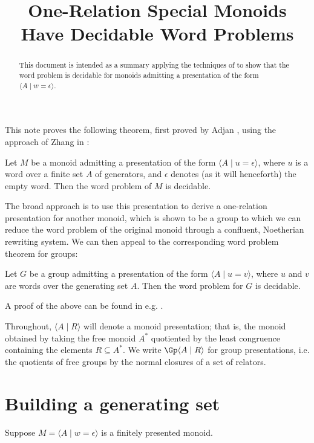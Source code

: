 \documentclass[11pt,libertine,widepage,nosubthm]{lmaths}
\title{One-Relation Special Monoids Have Decidable Word Problems}
\author{}
\date{}
\begin{document}
\maketitle

\begin{abstract}%
This document is intended as a summary applying the techniques of \cite{Zhang1992a} to show that the word problem is decidable for monoids admitting a presentation of the form $\langle A \mid w = \epsilon\rangle$.
\end{abstract}


This note proves the following theorem, first proved by Adjan \cite{Adian1966}, using the approach of Zhang in \cite{Zhang1992a}:
\begin{theorem}[Adjan] \label{thm:ors-decidablewp}
	Let $M$ be a monoid admitting a presentation of the form $\langle A \mid u = \epsilon\rangle$, where $u$ is a word over a finite set $A$ of generators, and $\epsilon$ denotes (as it will henceforth) the empty word. Then the word problem of $M$ is decidable.
\end{theorem}

The broad approach is to use this presentation to derive a one-relation presentation for another monoid, which is shown to be a group to which we can reduce the word problem of the original monoid through a confluent, Noetherian rewriting system. We can then appeal to the corresponding word problem theorem for groups:
\begin{theorem}[Magnus] \label{thm:orgp-decidablewp}
	Let $G$ be a group admitting a presentation of the form $\langle A \mid u = v\rangle$, where $u$ and $v$ are words over the generating set $A$. Then the word problem for $G$ is decidable.
\end{theorem}

A proof of the above can be found in e.g. \cite{Magnus2004}.

Throughout, $\langle A \mid R \rangle$ will denote a monoid presentation; that is, the monoid obtained by taking the free monoid $A^*$ quotiented by the least congruence containing the elements $R \subseteq A^*$. We write $\Gp \langle A \mid R \rangle$ for group presentations, i.e. the quotients of free groups by the normal closures of a set of relators.


\section{Building a generating set}

Suppose $M = \langle A \mid w = \epsilon\rangle$ is a finitely presented monoid.
\end{document}
